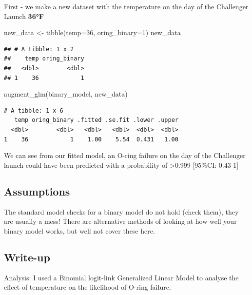 \documentclass[
]{book}
\newenvironment{Shaded}{\begin{snugshade}}{\end{snugshade}}
\newcommand{\AttributeTok}[1]{\textcolor[rgb]{0.77,0.63,0.00}{#1}}
\newcommand{\DecValTok}[1]{\textcolor[rgb]{0.00,0.00,0.81}{#1}}
\newcommand{\FunctionTok}[1]{\textcolor[rgb]{0.00,0.00,0.00}{#1}}
\newcommand{\NormalTok}[1]{#1}
\newcommand{\OtherTok}[1]{\textcolor[rgb]{0.56,0.35,0.01}{#1}}
\begin{document}
First - we make a new dataset with the temperature on the day of the Challenger Launch \textbf{36°F}

\begin{Shaded}
\begin{Highlighting}[]
\NormalTok{new\_data }\OtherTok{\textless{}{-}} \FunctionTok{tibble}\NormalTok{(}\AttributeTok{temp=}\DecValTok{36}\NormalTok{, }\AttributeTok{oring\_binary=}\DecValTok{1}\NormalTok{)}
\NormalTok{new\_data}
\end{Highlighting}
\end{Shaded}

\begin{verbatim}
## # A tibble: 1 x 2
##    temp oring_binary
##   <dbl>        <dbl>
## 1    36            1
\end{verbatim}

\begin{Shaded}
\begin{Highlighting}[]
\FunctionTok{augment\_glm}\NormalTok{(binary\_model, new\_data)}
\end{Highlighting}
\end{Shaded}

\begin{verbatim}
# A tibble: 1 x 6
   temp oring_binary .fitted .se.fit .lower .upper
  <dbl>        <dbl>   <dbl>   <dbl>  <dbl>  <dbl>
1    36            1    1.00    5.54  0.431   1.00
\end{verbatim}

We can see from our fitted model, an O-ring failure on the day of the Challenger launch could have been predicted with a probability of \textgreater0.999 {[}95\%CI: 0.43-1{]}

\hypertarget{assumptions-1}{%
\subsection{Assumptions}\label{assumptions-1}}

The standard model checks for a binary model do not hold (check them), they are usually a mess! There are alternative methods of looking at how well your binary model works, but well not cover these here.

\hypertarget{write-up-1}{%
\subsection{Write-up}\label{write-up-1}}

Analysis: I used a Binomial logit-link Generalized Linear Model to analyse the effect of temperature on the likelihood of O-ring failure.
\end{document}
